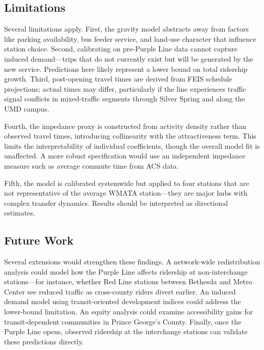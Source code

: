 \documentclass[11pt]{article}
\begin{document}
\subsection{Limitations}

Several limitations apply. First, the gravity model abstracts away from
factors like parking availability, bus feeder service, and land-use
character that influence station choice. Second, calibrating on pre-Purple
Line data cannot capture induced demand---trips that do not currently exist
but will be generated by the new service. Predictions here likely represent
a lower bound on total ridership growth. Third, post-opening travel times
are derived from FEIS schedule projections; actual times may differ,
particularly if the line experiences traffic signal conflicts in
mixed-traffic segments through Silver Spring and along the UMD campus.

Fourth, the impedance proxy is constructed from activity density rather
than observed travel times, introducing collinearity with the attractiveness
term. This limits the interpretability of individual coefficients, though
the overall model fit is unaffected. A more robust specification would use
an independent impedance measure such as average commute time from ACS data.

Fifth, the model is calibrated systemwide but applied to four stations that
are not representative of the average WMATA station---they are major hubs
with complex transfer dynamics. Results should be interpreted as directional
estimates.

\subsection{Future Work}

Several extensions would strengthen these findings. A network-wide
redistribution analysis could model how the Purple Line affects ridership at
non-interchange stations---for instance, whether Red Line stations between
Bethesda and Metro Center see reduced traffic as cross-county riders divert
earlier. An induced demand model using transit-oriented development indices
could address the lower-bound limitation. An equity analysis could examine
accessibility gains for transit-dependent communities in Prince George's
County. Finally, once the Purple Line opens, observed ridership at the
interchange stations can validate these predictions directly.

\end{document}
